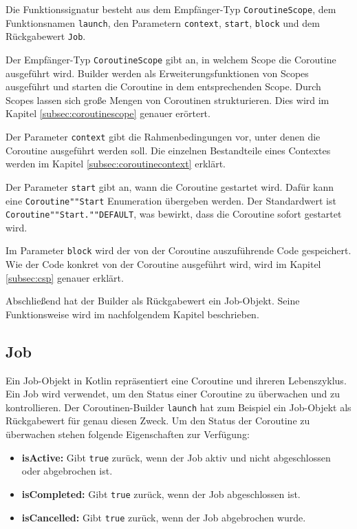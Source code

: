 \documentclass[fontsize=12pt,paper=a4,twoside=semi,parskip=half-,headsepline,headinclude]{scrreprt}
\begin{document}
Die Funktionssignatur besteht aus dem Empfänger-Typ \texttt{CoroutineScope}, dem Funktionsnamen \texttt{launch}, den Parametern \texttt{context}, \texttt{start}, \texttt{block} und dem Rückgabewert \texttt{Job}.

Der Empfänger-Typ \texttt{CoroutineScope} gibt an, in welchem Scope die Coroutine ausgeführt wird. Builder werden als Erweiterungsfunktionen von Scopes ausgeführt und starten die Coroutine in dem entsprechenden Scope. Durch Scopes lassen sich große Mengen von Coroutinen strukturieren. Dies wird im Kapitel \ref{subsec:coroutinescope} genauer erörtert.

Der Parameter \texttt{context} gibt die Rahmenbedingungen vor, unter denen die Coroutine ausgeführt werden soll. Die einzelnen Bestandteile eines Contextes werden im Kapitel \ref{subsec:coroutinecontext} erklärt.

Der Parameter \texttt{start} gibt an, wann die Coroutine gestartet wird. Dafür kann eine \texttt{Coroutine""Start} Enumeration übergeben werden. Der Standardwert ist \texttt{Coroutine""Start.""DEFAULT}, was bewirkt, dass die Coroutine sofort gestartet wird.

Im Parameter \texttt{block} wird der von der Coroutine auszuführende Code gespeichert. Wie der Code konkret von der Coroutine ausgeführt wird, wird im Kapitel \ref{subsec:csp} genauer erklärt.

Abschließend hat der Builder als Rückgabewert ein Job-Objekt. Seine Funktionsweise wird im nachfolgendem Kapitel beschrieben.


\subsection{Job}

Ein Job-Objekt in Kotlin repräsentiert eine Coroutine und ihreren Lebenszyklus. Ein Job wird verwendet, um den Status einer Coroutine zu überwachen und zu kontrollieren. Der Coroutinen-Builder \texttt{launch} hat zum Beispiel ein Job-Objekt als Rückgabewert für genau diesen Zweck. Um den Status der Coroutine zu überwachen stehen folgende Eigenschaften zur Verfügung:

\begin{itemize}
	\item \textbf{isActive:} Gibt \texttt{true} zurück, wenn der Job aktiv und nicht abgeschlossen oder abgebrochen ist.
	\item \textbf{isCompleted:} Gibt \texttt{true} zurück, wenn der Job abgeschlossen ist.
	\item \textbf{isCancelled:} Gibt \texttt{true} zurück, wenn der Job abgebrochen wurde.
\end{itemize}
\end{document}
